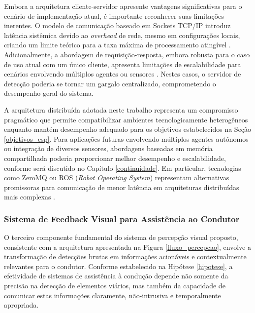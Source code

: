 
Embora a arquitetura cliente-servidor apresente vantagens significativas para o cenário de implementação atual, é importante reconhecer suas limitações inerentes. O modelo de comunicação baseado em Sockets TCP/IP introduz latência sistêmica devido ao \textit{overhead} de rede, mesmo em configurações locais, criando um limite teórico para a taxa máxima de processamento atingível \cite{kato2015open}. Adicionalmente, a abordagem de requisição-resposta, embora robusta para o caso de uso atual com um único cliente, apresenta limitações de escalabilidade para cenários envolvendo múltiplos agentes ou sensores \cite{iordache2021smart}. Nestes casos, o servidor de detecção poderia se tornar um gargalo centralizado, comprometendo o desempenho geral do sistema.

A arquitetura distribuída adotada neste trabalho representa um compromisso pragmático que permite compatibilizar ambientes tecnologicamente heterogêneos enquanto mantém desempenho adequado para os objetivos estabelecidos na Seção \ref{objetivos_esp}. Para aplicações futuras envolvendo múltiplos agentes autônomos ou integração de diversos sensores, abordagens baseadas em memória compartilhada poderia proporcionar melhor desempenho e escalabilidade, conforme será discutido no Capítulo \ref{continuidade}. Em particular, tecnologias como ZeroMQ ou ROS (\textit{Robot Operating System}) representam alternativas promissoras para comunicação de menor latência em arquiteturas distribuídas mais complexas \cite{kato2015open}.

\subsubsection{Sistema de Feedback Visual para Assistência ao Condutor} \label{subsubsec:feedback_visual}

O terceiro componente fundamental do sistema de percepção visual proposto, consistente com a arquitetura apresentada na Figura \ref{fluxo_percepcao}, envolve a transformação de detecções brutas em informações acionáveis e contextualmente relevantes para o condutor. Conforme estabelecido na Hipótese \ref{hipotese}, a efetividade de sistemas de assistência à condução depende não somente da precisão na detecção de elementos viários, mas também da capacidade de comunicar estas informações claramente, não-intrusiva e temporalmente apropriada.

